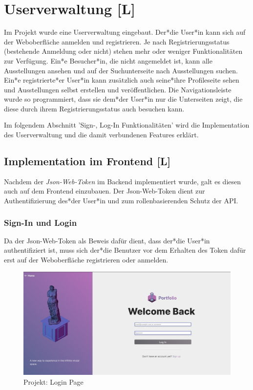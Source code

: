 \section{Userverwaltung [L]}
Im Projekt wurde eine Userverwaltung eingebaut. Der*die User*in kann sich auf der Weboberfläche anmelden und registrieren. Je nach Registrierungsstatus (bestehende Anmeldung oder nicht) stehen mehr oder weniger Funktionalitäten zur Verfügung. Ein*e Besucher*in, die nicht angemeldet ist, kann alle Ausstellungen ansehen und auf der Suchunterseite nach Ausstellungen suchen. Ein*e registrierte*er User*in kann zusätzlich auch seine*ihre Profileseite sehen und Ausstellungen selbst erstellen und veröffentlichen. Die Navigationsleiste wurde so programmiert, dass sie dem*der User*in nur die Unterseiten zeigt, die diese durch ihrem Registrierungsstatus auch besuchen kann. 

Im folgendem Abschnitt 'Sign-, Log-In Funktionalitäten' wird die Implementation des Userverwaltung und die damit verbundenen Features erklärt. 

\subsection{Implementation im Frontend [L]}
Nachdem der \emph{Json-Web-Token} im Backend implementiert wurde, galt es diesen auch auf dem Frontend einzubauen. Der Json-Web-Token dient zur Authentifizierung des*der User*in und zum rollenbasierenden Schutz der API. 

\subsubsection{Sign-In und Login}
Da der Json-Web-Token als Beweis dafür dient, dass der*die User*in authentifiziert ist, muss sich der*die Benutzer vor dem Erhalten des Token dafür erst auf der Weboberfläche registrieren oder anmelden. 

\begin{figure}
    \centering
    \includegraphics[scale=0.25]{pics/GalleryLogIn.png}
    \caption{Projekt: Login Page}
    \label{fig:impl:login}
\end{figure}

